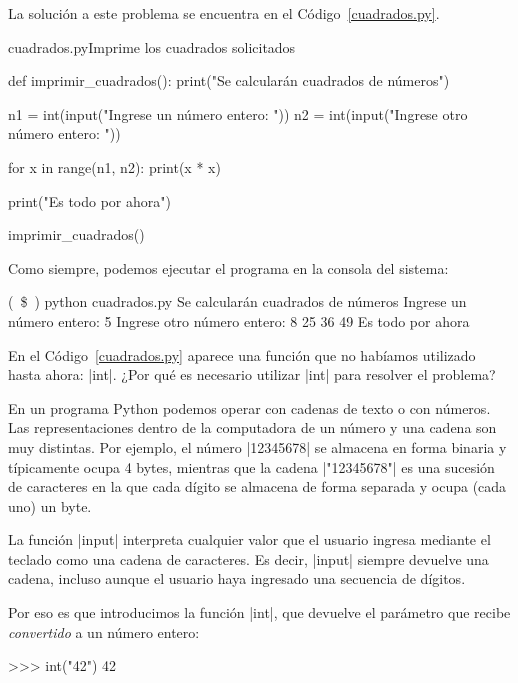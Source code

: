 \begin{solucion}
La solución a este problema se encuentra en el Código~\ref{cuadrados.py}.

\begin{codigo}{cuadrados.py}{Imprime los cuadrados solicitados}
\label{cuadrados.py}
\begin{codigo-python}
def imprimir_cuadrados():
    print("Se calcularán cuadrados de números")

    n1 = int(input("Ingrese un número entero: "))
    n2 = int(input("Ingrese otro número entero: "))

    for x in range(n1, n2):
        print(x * x)

    print("Es todo por ahora")

imprimir_cuadrados()
\end{codigo-python}
\end{codigo}

Como siempre, podemos ejecutar el programa en la consola del sistema:

\begin{codigo-nohl-sn}
(~\$~) python cuadrados.py
Se calcularán cuadrados de números
Ingrese un número entero: 5
Ingrese otro número entero: 8
25
36
49
Es todo por ahora
\end{codigo-nohl-sn}
\end{solucion}

En el Código~\ref{cuadrados.py} aparece una función que no habíamos
utilizado hasta ahora: |int|. ¿Por qué es necesario utilizar |int| para
resolver el problema?

En un programa Python podemos operar con cadenas de texto o con números.  Las
representaciones dentro de la computadora de un número y una cadena son muy
distintas. Por ejemplo, el número |12345678| se almacena en forma binaria y
típicamente ocupa 4 bytes, mientras que la cadena |"12345678"| es una sucesión
de caracteres en la que cada dígito se almacena de forma separada y ocupa (cada
uno) un byte.

La función |input| interpreta cualquier valor que el usuario ingresa mediante
el teclado como una cadena de caracteres. Es decir, |input| siempre devuelve
una cadena, incluso aunque el usuario haya ingresado una secuencia de dígitos.

Por eso es que introducimos la función |int|, que devuelve el parámetro que
recibe \emph{convertido} a un número entero:

\begin{codigo-python-sn}
>>> int("42")
42
\end{codigo-python-sn}

